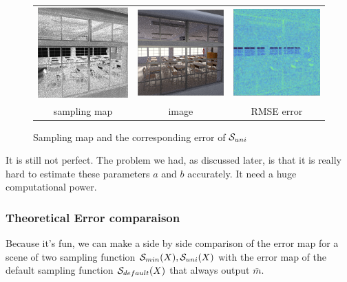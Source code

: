 \documentclass{classeENS}
\begin{document}
\begin{figure}[H]
    \centering
    \caption{Sampling map and the corresponding error of $\mathcal S_{uni}$}
    \begin{tabular}{ccc}
    \includegraphics[width=45mm]{image/without/sm.png}
    & \includegraphics[width=45mm]{image/without/normal.png}
    & \includegraphics[width=45mm]{image/without/RMSE_mean.png} \\
    sampling map & image & RMSE error
    \end{tabular}
\end{figure}

It is still not perfect. The problem we had, as discussed later, is that it 
is really hard to estimate these parameters $a$ and $b$ accurately. It need 
a huge computational power.

\subsubsection{Theoretical Error comparaison}

Because it's fun, we can make a side by side comparison of the error map for a scene of 
two sampling function $\mathcal S_{min}(X), \mathcal S_{uni}(X)$ with the error map
of the default sampling function $\mathcal S_{default}(X)$ that always output $\bar m$.
\end{document}
